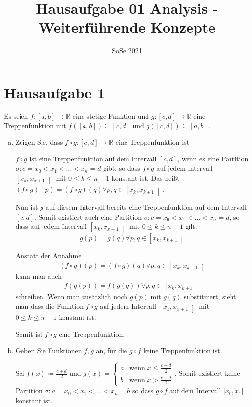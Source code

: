 \documentclass{article}
\author{}
\date{SoSe 2021}
\title{Hausaufgabe 01 Analysis - Weiterführende Konzepte}
\begin{document}
\section*{Hausaufgabe 1}

Es seien $f \colon [a, b] \to \mathbb{R}$ eine stetige Funktion und
$g \colon [c, d] \to \mathbb{R}$ eine Treppenfunktion mit
$f([a, b]) \subseteq [c, d]$ und $g([c, d]) \subseteq [a, b]$.

\begin{enumerate}[a)]
\item Zeigen Sie, dass $f \circ g \colon [c, d] \to \mathbb{R}$ eine
  Treppenfunktion ist

  $f \circ g$ ist eine Treppenfunktion auf dem Intervall $[c, d]$, wenn es
  eine Partition $\sigma \colon c = x_0 < x_1 < \ldots < x_n = d$ gibt, so dass
  $f \circ g$ auf jedem Intervall $\left[x_k, x_{x + 1}\right[$ mit
  $0 \leq k \leq n - 1$ konstant ist.
  Das heißt $(f \circ g)(p) = (f \circ g)(q) \forall p, q \in \left[ x_k, x_{k + 1}\right[$.

  Nun ist $g$ auf diesem Intervall bereits eine Treppenfunktion auf dem
  Intervall $[c, d]$.
  Somit existiert auch eine Partition
  $\sigma \colon c = x_0 < x_1 < \ldots < x_n = d$, so dass auf jedem Intervall
  $\left[x_k, x_{x + 1}\right[$ mit $0 \leq k \leq n - 1$ gilt:
  \[
    g(p) = g(q) \forall p, q \in \left[ x_k, x_{k + 1}\right[
  \]

  Anstatt der Annahme
  \[
    (f \circ g)(p) = (f \circ g)(q) \forall p, q \in \left[ x_k, x_{k + 1}\right[
  \]
  kann man auch
  \[
    f(g(p)) = f(g(q)) \forall p, q \in \left[ x_k, x_{k + 1}\right[
  \]
  schreiben. Wenn man zusätzlich noch $g(p)$ mit $g(q)$ substituiert, sieht man
  dass die Funktion
  $f \circ g$ auf jedem Intervall $\left[x_k, x_{x + 1}\right[$ mit
  $0 \leq k \leq n - 1$ konstant ist.

  Somit ist $f \circ g$ eine Treppenfunktion.
  
\item Geben Sie Funktionen $f, g$ an, für die $g \circ f$ keine
  Treppenfunktion ist.

  Sei $f(x) \coloneqq \frac{c + d}{2}$ und $g(x) = \begin{cases}
    a & \text{wenn $x \leq \frac{c + d}{2}$} \\
    b & \text{wenn $x > \frac{c + d}{2}$}
  \end{cases}$.
  Somit existiert keine Partition
  $\sigma \colon a = x_0 < x_1 < \ldots < x_n = b$
  so dass $g \circ f$ auf dem Intervall $[x_0, x_1[$ konstant ist.
\end{enumerate}
\end{document}

